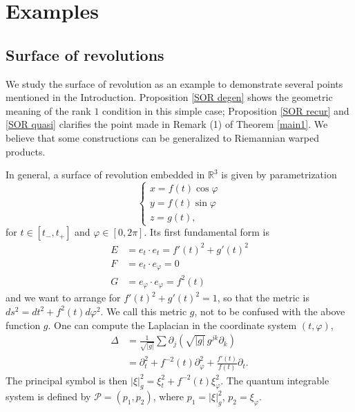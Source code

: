 \documentclass[12pt,reqno]{amsart}
\newcommand{\R}{{\mathbb R}}
\renewcommand{\phi}{\varphi}
\numberwithin{equation}{section}
\begin{document}





\bigskip


\section{Examples}\label{section4}

\subsection{Surface of revolutions}
We study the surface of revolution as an example to demonstrate several points mentioned in the Introduction. Proposition \ref{SOR degen} shows the geometric meaning of the rank $1$ condition in this simple case; Proposition \ref{SOR recur} and \ref{SOR quasi} clarifies the point made in Remark (1) of Theorem \ref{main1}. We believe that some constructions can be generalized to Riemannian warped products.

In general, a surface of revolution embedded in $\R^3$ is given by parametrization
\begin{equation}\label{SoR parametrization}
    \begin{cases}
        x=f(t)\cos\phi\\
        y=f(t)\sin\phi\\
        z=g(t),
    \end{cases}
\end{equation}
for $t\in [t_-,t_+]$ and $\phi\in [0,2\pi]$. Its first fundamental form is 
\begin{align*}
    E&=e_t\cdot e_t=f'(t)^2+g'(t)^2\\
    F&=e_t\cdot e_\phi=0\\
    G&=e_\phi\cdot e_\phi=f^2(t)
\end{align*}
and we want to arrange for $f'(t)^2+g'(t)^2=1$, so that the metric is $ds^2=dt^2+f^2(t)d\phi^2$. We call this metric $g$, not to be confused with the above function $g$. One can compute the Laplacian in the coordinate system $(t,\phi)$,
\begin{align}
    \Delta &=\frac{1}{\sqrt{|g|}}\sum\partial_j(\sqrt{|g|}\,g^{jk}\partial_k)\nonumber\\
    &=\partial_t^2+f^{-2}(t)\partial_\phi^2+\frac{f'(t)}{f(t)}\partial_t.
\end{align}
The principal symbol is then $|\xi|^2_g=\xi_t^2+f^{-2}(t)\xi_{\phi}^2$. The quantum integrable system is defined by $\mathcal{P}=(p_1,p_2)$, where $p_1=|\xi|^2_g$, $p_2=\xi_{\phi}$.
\end{document}
